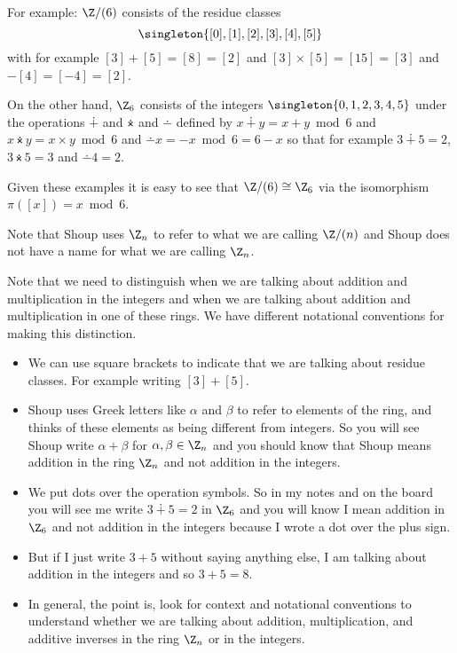 \documentclass[oneside,12pt]{amsart}
\begin{document}
For example:
$\Z/(6)$ consists of the residue classes
$$\singleton{[0],[1],[2], [3], [4], [5]}$$
with for example $[3] + [5] = [8] = [2]$ and $[3]\times[5] = [15] = [3]$
and $-[4] = [-4] = [2]$.

On the other hand,
$\Z_6$ consists of the integers $\singleton{0,1,2,3,4,5}$ under the operations
$\dotplus$ and $\dottimes$ and $\dotminus$ defined by $x\dotplus y = x+y\bmod 6$ and
$x\dottimes y = x\times y \bmod 6$ and $\dotminus x = -x \bmod 6 = 6 - x$ so that
for example $3\dotplus 5 = 2$, $3\dottimes 5 = 3$ and $\dotminus 4 = 2$.

Given these examples it is easy to see that $\Z/(6) \cong \Z_6$ via the isomorphism
$\pi([x]) = x \bmod 6$.

Note that Shoup uses $\Z_n$ to refer to what we are calling $\Z/(n)$ and Shoup does not
have a name for what we are calling $\Z_n$.

Note that we need to distinguish when we are talking about addition and multiplication in the
integers and when we are talking about addition and multiplication in one of these rings.
We have different notational conventions for making this distinction.

\begin{itemize}
\item We can use square brackets to indicate that we are talking about residue classes.
For example writing $[3] + [5]$.
\item Shoup uses Greek letters like $\alpha$ and $\beta$ to refer to elements of the ring,
and thinks of these elements as being different from integers. So you will see
Shoup write $\alpha+\beta$ for $\alpha,\beta\in\Z_n$ and you should know that Shoup means
addition in the ring $\Z_n$ and not addition in the integers.
\item We put dots over the operation symbols. So in my notes and on the board you will see
me write $3\dotplus 5 = 2$ in $\Z_6$ and you will know I mean addition in $\Z_6$ and not
addition in the integers because I wrote a dot over the plus sign.
\item But if I just write $3+5$ without saying anything else, I am talking about addition in the
integers and so $3+5=8$.
\item In general, the point is, look for context and notational conventions to understand whether
we are talking about addition, multiplication, and additive inverses in the ring $\Z_n$ or in the
integers.
\end{itemize}
\end{document}
